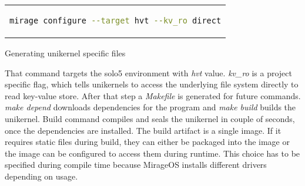 \begin{code}[htpb]
    \centering
    \begin{tabular}{c}
    \begin{lstlisting}[language=bash]
      mirage configure --target hvt --kv_ro direct
  \end{lstlisting}
  \end{tabular}
  \caption{Generating unikernel specific files}\label{fig:mirage_configure}
\end{code}

That command targets the solo5 environment with \textit{hvt} value. \textit{kv\_ro} is a project specific flag, which tells unikernels to access the underlying file system directly to read key-value store. After that step a \textit{Makefile} is generated for future commands. \textit{make depend} downloads dependencies for the program and \textit{make build} builds the unikernel. Build command compiles and seals the unikernel in couple of seconds, once the dependencies are installed. The build artifact is a single image. If it requires static files during build, they can either be packaged into the image or the image can be configured to access them during runtime. This choice has to be specified during compile time because MirageOS installs different drivers depending on usage.
